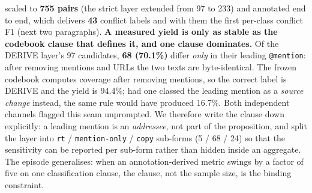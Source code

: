 scaled to \textbf{755 pairs} (the strict layer extended from 97 to 233) and annotated end to end, which delivers \textbf{43} conflict labels and with them the first per-class conflict F1 (next two paragraphs).
\textbf{A measured yield is only as stable as the codebook clause that defines it, and one clause dominates.} Of the DERIVE layer's 97 candidates, \textbf{68 (70.1\%)} differ \emph{only} in their leading \texttt{@mention}: after removing mentions and URLs the two texts are byte-identical. The frozen codebook computes coverage after removing mentions, so the correct label is DERIVE and the yield is 94.4\%; had one classed the leading mention as a \emph{source change} instead, the same rule would have produced 16.7\%. Both independent channels flagged this seam unprompted. We therefore write the clause down explicitly: a leading mention is an \emph{addressee}, not part of the proposition, and split the layer into \texttt{rt} / \texttt{mention-only} / \texttt{copy} sub-forms (5 / 68 / 24) so that the sensitivity can be reported per sub-form rather than hidden inside an aggregate. The episode generalises: when an annotation-derived metric swings by a factor of five on one classification clause, the clause, not the sample size, is the binding constraint.
